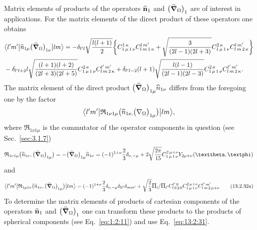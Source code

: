 Matrix elements of products of the operators \(\widehat{\mathbf{n}}_{1}\) and \(\bigl(\widehat{\boldsymbol{\nabla}}_{\Omega}\bigr)_{1}\) are of interest in applications. For the matrix elements of the direct product of these operators one obtains
\begin{align}
& 
\bigl\langle  l^{\prime} m^{\prime} \big|  \widehat{n}_{1 \mu}\bigl(\widehat{\boldsymbol{\nabla}}_{\Omega}\bigr)_{1 \nu} \big| l m \bigr\rangle=-\delta_{l^{\prime} l} \sqrt{\frac{l(l+1)}{2}}\biggl\{
C_{1\,\mu\,1\,\nu}^{1\,\kappa} 
C_{l\,m\,1\,\kappa}^{l\,m^{\prime}}+\sqrt{\frac{3}{(2 l-1)(2 l+3)}} 
C_{1\,\mu\,1\,\nu}^{2\,\kappa} 
C_{l\,m\,2\,\kappa}^{l\,m^{\prime}}\biggr\} \notag\\
& -\delta_{l^{\prime} l+2} l \sqrt{\frac{(l+1)(l+2)}{(2 l+3)(2 l+5)}} 
C_{1\,\mu\,1\,\nu}^{2\,\kappa} 
C_{l\,m\,2\,\kappa}^{l^{\prime}\,m^{\prime}}+\delta_{l^{\prime} l-2}(l+1) \sqrt{\frac{l(l-1)}{(2 l-1)(2 l-3)}}
C_{1\,\mu\,1\,\nu}^{2\,\kappa} 
C_{l\,m\,2\,\kappa}^{l^{\prime}\,m^{\prime}}. \label{eq:13:2:31}
\end{align}
The matrix element of the direct product \(\bigl(\widehat{\boldsymbol{\nabla}}_{\Omega}\bigr)_{1 \mu} \widehat{n}_{1 \nu}\) differs from the foregoing one by the factor
\begin{equation*}
\bigl\langle  l^{\prime} m^{\prime} \big|  \mathfrak{R}_{1 \nu 1 \mu}\bigl(\widehat{n}_{1 \nu,}\bigl(\nabla_{\Omega}\bigr)_{1 \mu}\bigr) \big| l m \bigr\rangle,
\end{equation*}
where \(\mathfrak{R}_{1 \nu 1 \mu}\) is the commutator of the operator components in question (see Sec.~\ref{sec:3.1.7})
\begin{equation}
\mathfrak{R}_{1 \nu 1 \mu}\bigl(\widehat{n}_{1 \nu},\bigl(\delop_{\Omega}\bigr)_{1 \mu}\bigr)=-\bigl(\delop_{\Omega}\bigr)_{1 \mu} \widehat{n}_{1 \nu}=(-1)^{1+\nu} \frac{2}{3} \delta_{\nu,-\mu}+2 \sqrt{\frac{2 \pi}{15}} 
\clebsch{1}{\mu}{1}{\nu}{2}{\mu+\nu} Y_{2 \mu+\nu}(\vartheta, \varphi) \label{eq:13:2:32}
\end{equation}
and
\begin{equation}
\braOket{l^{\prime} m^{\prime}}{\mathfrak{R}_{1 \mu 1 \nu}\bigl(\widehat{n}_{1 \nu},\bigl(\delop_{\Omega}\bigr)_{1 \mu}\bigr)}{l m}=(-1)^{1+\nu} \frac{2}{3} \delta_{\nu,-\mu} \delta_{l l^{\prime}} \delta_{m m^{\prime}}+\sqrt{\frac{2}{3}} \Fact{l}/\Fact{l'}
\clebsch{l}{0}{2}{0}{l^{\prime}}{0} 
\clebsch{1}{\mu}{1}{\nu}{2}{\mu+\nu} 
\clebsch{l}{m}{2}{\mu+\nu}{l^{\prime}}{m^{\prime}} \tag{13.2.32a}
\end{equation}
To determine the matrix elements of products of cartesian components of the operators \(\widehat{\mathbf{n}}_{1}\) and \(\bigl(\widehat{\boldsymbol{\nabla}}_{\Omega}\bigr)_{1}\) one can transform these products to the products of spherical components (see Eq.~\eqref{eq:1:2:11}) and use Eq.~\eqref{eq:13:2:31}.

